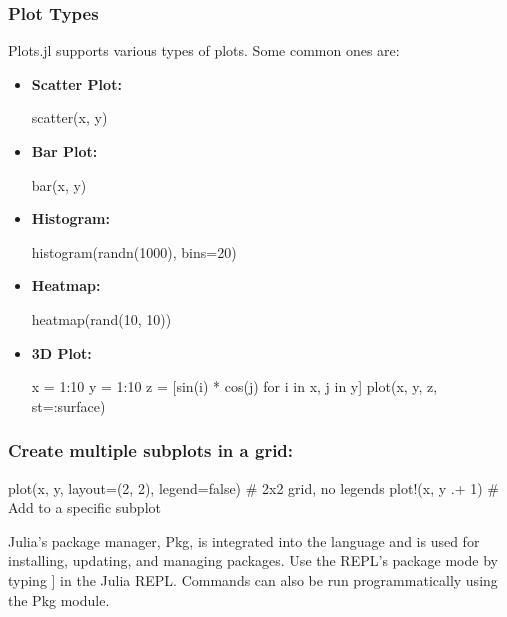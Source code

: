 \documentclass{report}
\begin{document}
     \subsubsection{Plot Types}
     \bigbreak \noindent 
     Plots.jl supports various types of plots. Some common ones are:
     \bigbreak \noindent 
     \begin{itemize}
         \item \textbf{Scatter Plot:}
             \bigbreak \noindent 
             \begin{jlcode}
             scatter(x, y)
             \end{jlcode}
         \item \textbf{Bar Plot:}
             \bigbreak \noindent 
             \begin{jlcode}
             bar(x, y)
             \end{jlcode}
         \item \textbf{Histogram:}
             \bigbreak \noindent 
             \begin{jlcode}
             histogram(randn(1000), bins=20)
             \end{jlcode}
         \item \textbf{Heatmap:}
             \bigbreak \noindent 
             \begin{jlcode}
             heatmap(rand(10, 10))
             \end{jlcode}
         \item \textbf{3D Plot:}
             \bigbreak \noindent 
             \begin{jlcode}
                 x = 1:10
                 y = 1:10
                 z = [sin(i) * cos(j) for i in x, j in y]
                 plot(x, y, z, st=:surface)
             \end{jlcode}
     \end{itemize}

     \bigbreak \noindent 
     \subsubsection{Create multiple subplots in a grid: }
     \bigbreak \noindent 
     \begin{jlcode}
     plot(x, y, layout=(2, 2), legend=false)  # 2x2 grid, no legends
    plot!(x, y .+ 1)  # Add to a specific subplot
     \end{jlcode}

     \pagebreak 
     \bigbreak \noindent 
     Julia's package manager, Pkg, is integrated into the language and is used for installing, updating, and managing packages. Use the REPL's package mode by typing ] in the Julia REPL. Commands can also be run programmatically using the Pkg module.
     \bigbreak \noindent 
\end{document}

